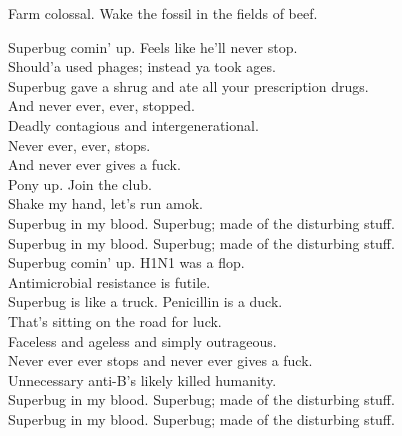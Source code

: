 Farm colossal. Wake the fossil in the fields of beef. \\




Superbug comin' up. Feels like he'll never stop. \\
Should'a used phages; instead ya took ages. \\
Superbug gave a shrug and ate all your prescription drugs. \\
And never ever, ever, stopped. \\
Deadly contagious and intergenerational. \\
Never ever, ever, stops. \\
And never ever gives a fuck. \\

Pony up. Join the club. \\
Shake my hand, let's run amok. \\

Superbug in my blood. Superbug; made of the disturbing stuff. \\
Superbug in my blood. Superbug; made of the disturbing stuff. \\

Superbug comin' up. H1N1 was a flop. \\
Antimicrobial resistance is futile. \\
Superbug is like a truck. Penicillin is a duck. \\
That's sitting on the road for luck. \\
Faceless and ageless and simply outrageous. \\
Never ever ever stops and never ever gives a fuck. \\

Unnecessary anti-B's likely killed humanity. \\

Superbug in my blood. Superbug; made of the disturbing stuff. \\
Superbug in my blood. Superbug; made of the disturbing stuff. \\




